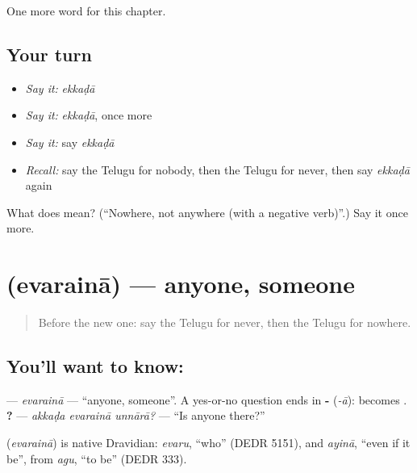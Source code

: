 \begin{grammarlens}[title={What you've built}]
One more word for this chapter.
\end{grammarlens}

\subsection*{Your turn}
\begin{itemize}
\raggedright
  \item \emph{Say it:} \emph{ekkaḍā}
  \item \emph{Say it:} \emph{ekkaḍā}, once more
  \item \emph{Say it:} say \emph{ekkaḍā}
  \item \emph{Recall:} say the Telugu for nobody, then the Telugu for never, then say \emph{ekkaḍā} again
\end{itemize}

\begin{tcolorbox}[breakable,colback=teal!4,colframe=teal!35!black,title={Before you move on}]
What does  mean? (\textquotedblleft{}Nowhere, not anywhere (with a negative verb)\textquotedblright{}.) Say it once more.
\end{tcolorbox}
\section[\texorpdfstring{\te{ఎవరైనా} (evarainā)}{ఎవరైనా (evarainā)}]{ (evarainā) — anyone, someone}

\label{lesson:TE-C153-evaraina}



\begin{quote}
Before the new one: say the Telugu for never, then the Telugu for nowhere.
\end{quote}

\subsection*{You'll want to know: }
\textbf{} — \emph{evarainā} — \textquotedblleft{}anyone, someone\textquotedblright{}. A yes-or-no question ends in \textbf{-} (\emph{-ā}): \textbf{} becomes \textbf{}. \textbf{  ?} — \emph{akkaḍa evarainā unnārā?} — \textquotedblleft{}Is anyone there?\textquotedblright{}

\begin{cousinweb}
\textbf{} (\emph{evarainā}) is native Dravidian: \emph{evaru}, \textquotedblleft{}who\textquotedblright{} (DEDR 5151), and \emph{ayinā}, \textquotedblleft{}even if it be\textquotedblright{}, from \emph{agu}, \textquotedblleft{}to be\textquotedblright{} (DEDR 333).
\end{cousinweb}

